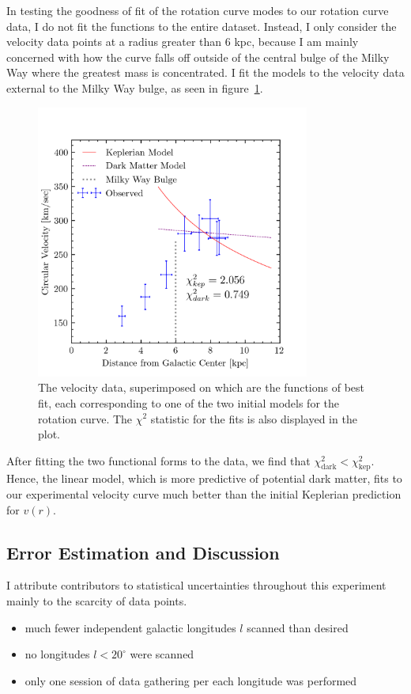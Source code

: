 \documentclass[aps,twocolumn,secnumarabic,balancelastpage,amsmath,amssymb,nofootinbib, floatfix]{revtex4-2}
\begin{document}
	In testing the goodness of fit of the rotation curve modes to our rotation curve data, I do not fit the functions to the entire dataset. Instead, I only consider the velocity data points at a radius greater than 6 kpc, because I am mainly concerned with how the curve falls off outside of the central bulge of the Milky Way where the greatest mass is concentrated. I fit the models to the velocity data external to the Milky Way bulge, as seen in figure~\ref{fig:rotfit}.
	\begin{figure}
		\includegraphics[width=9cm]{rot_curve_fit.png}
		\caption{The velocity data, superimposed on which are the functions of best fit, each corresponding to one of the two initial models for the rotation curve. The $\chi^{2}$ statistic for the fits is also displayed in the plot.}
		\label{fig:rotfit}
	\end{figure}


	After fitting the two functional forms to the data, we find that $\chi^{2}_{\mathrm{dark}}<\chi^{2}_{\mathrm{kep}}$. Hence, the linear model, which is more predictive of potential dark matter, fits to our experimental velocity curve much better than the initial Keplerian prediction for $v(r)$.
	
	\subsection{Error Estimation and Discussion}
	I attribute contributors to statistical uncertainties throughout this experiment mainly to the scarcity of data points.
	\begin{itemize}
		\item much fewer independent galactic longitudes $l$ scanned than desired
		\item no longitudes $l<20^{\circ}$ were scanned
		\item only one session of data gathering per each longitude was performed
	\end{itemize}
	
\end{document}
